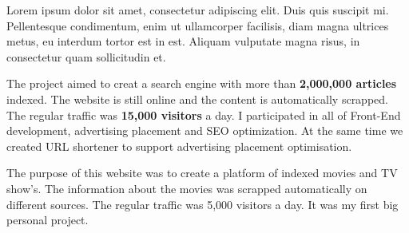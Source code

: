 \documentclass[letterpaper]{my-resume} %
\begin{document}
\begin{minipage}[t]{0.66\textwidth}

Lorem ipsum dolor sit amet, consectetur adipiscing elit. Duis quis suscipit mi. Pellentesque condimentum, enim ut ullamcorper facilisis, diam magna ultrices metus, eu interdum tortor est in est. Aliquam vulputate magna risus, in consectetur quam sollicitudin et.

\sectionspace %



The project aimed to creat a search engine with more than \textbf{2,000,000 articles} indexed. The website is still online and the content is automatically scrapped. The regular traffic was \textbf{15,000 visitors} a day. I participated in all of Front-End development, advertising placement and SEO optimization. At the same time we created URL shortener to support advertising placement optimisation.

\sectionspace %



The purpose of this website was to create a platform of indexed movies and TV show’s. The information about the movies was scrapped automatically on different sources. The regular traffic was 5,000 visitors a day. It was my first big personal project.

\sectionspace %

\end{minipage}
\end{document}
